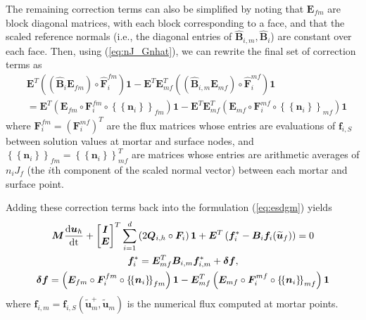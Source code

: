 \documentclass{svjour3}                     %
\renewcommand{\hat}{\widehat}
\renewcommand{\tilde}{\widetilde}
\newcommand{\td}[2]{\frac{{\rm d}#1}{{\rm d}{\rm #2}}}
\newcommand{\LRp}[1]{\left( #1 \right)}
\newcommand{\LRc}[1]{\left\{ #1 \right\}}
\newcommand{\avg}[1] {\ensuremath{\LRc{\!\LRc{#1}\!}}}
\begin{document}
The remaining correction terms can also be simplified by noting that $\bm{E}_{fm}$ are block diagonal matrices, with each block corresponding to a face, and that the scaled reference normals (i.e., the diagonal entries of $\hat{\bm{B}}_{i,m}, \hat{\bm{B}}_{i}$) are constant over each face.  
Then, using (\ref{eq:nJ_Gnhat}), we can rewrite the final set of correction terms as
\begin{align*}
&\bm{E}^T \LRp{\LRp{\hat{\bm{B}}_i\bm{E}_{fm}}\circ \hat{\bm{F}}_i^{fm}}\bm{1} - \bm{E}^T\bm{E}_{mf}^T \LRp{ \LRp{\hat{\bm{B}}_{i,m}\bm{E}_{mf}} \circ \hat{\bm{F}}_i^{mf}}\bm{1}\\
& = \bm{E}^T \LRp{{\bm{E}_{fm}}\circ \bm{F}_i^{fm} \circ \avg{\bm{n}_i}_{fm}}\bm{1} - \bm{E}^T\bm{E}_{mf}^T \LRp{ {\bm{E}_{mf}} \circ {\bm{F}}_i^{mf} \circ \avg{\bm{n}_i}_{mf}}\bm{1}
\end{align*}
where $\bm{F}_i^{fm} = \LRp{\bm{F}_i^{mf}}^T$ are the flux matrices whose entries are evaluations of $\bm{f}_{i,S}$ between solution values at mortar and surface nodes, and $\avg{\bm{n}_i}_{fm} = \avg{\bm{n}_i}_{mf}^T$ are matrices whose entries are arithmetic averages of $n_iJ_f$ (the $i$th component of the scaled normal vector) between each mortar and surface point.

Adding these correction terms back into the formulation (\ref{eq:esdgm}) yields 
\begin{gather}
{\bm{M}}\td{\bm{u}_h}{t} + \begin{bmatrix} \bm{I} \\ \bm{E} \end{bmatrix}^T
\sum_{i=1}^d \LRp{2{\bm{Q}}_{i,h} \circ \bm{F}_i}\bm{1} + \bm{E}^T\LRp{\bm{f}_i^*- \bm{B}_i\bm{f}_i(\tilde{\bm{u}}_f)} = 0 \label{eq:esdgm_mortar}\\
\bm{f}_i^* = \bm{E}_{mf}^T{\bm{B}}_{i,m}\bm{f}^*_{i,m} + \bm{\delta f},\nonumber\\
\bm{\delta f} =   \LRp{{\bm{E}_{fm}}\circ \bm{F}_i^{fm} \circ \avg{\bm{n}_i}_{fm}}\bm{1} - \bm{E}_{mf}^T \LRp{ {\bm{E}_{mf}} \circ {\bm{F}}_i^{mf} \circ \avg{\bm{n}_i}_{mf}}\bm{1}\nonumber
\end{gather}
where $\bm{f}_{i,m} = \bm{f}_{i,S}(\tilde{\bm{u}}_m^+,\tilde{\bm{u}}_m)$ is the numerical flux computed at mortar points.  
\end{document}
